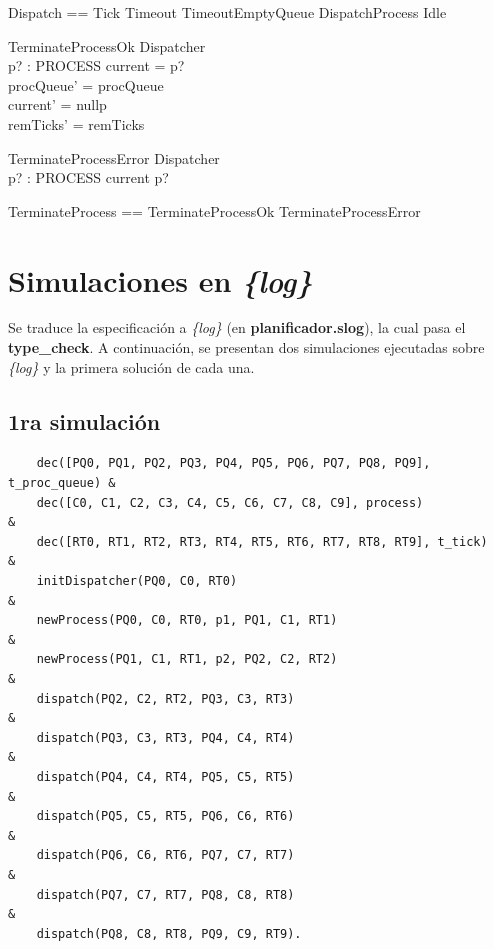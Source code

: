\documentclass{article}
\begin{document}
\begin{zed}
    Dispatch == Tick \lor Timeout \lor TimeoutEmptyQueue \lor DispatchProcess \lor Idle
\end{zed}

\begin{schema}{TerminateProcessOk}
    \Delta Dispatcher \\
    p? : PROCESS
\where
    current = p? \\
    procQueue' = procQueue \\
    current' = nullp \\
    remTicks' = remTicks
\end{schema}

\begin{schema}{TerminateProcessError}
    \Xi Dispatcher \\
    p? : PROCESS
\where
    current \neq p?
\end{schema}

\begin{zed}
    TerminateProcess == TerminateProcessOk \lor TerminateProcessError
\end{zed}


\section{Simulaciones en \textit{\{log\}}}

Se traduce la especificación a \textit{\{log\}} (en \textbf{planificador.slog}), la cual pasa el \textbf{type\_check}. A continuación, se presentan dos simulaciones ejecutadas sobre \textit{\{log\}} y la primera solución de cada una.


\subsection*{1ra simulación}

\begin{verbatim}
    dec([PQ0, PQ1, PQ2, PQ3, PQ4, PQ5, PQ6, PQ7, PQ8, PQ9], t_proc_queue) &
    dec([C0, C1, C2, C3, C4, C5, C6, C7, C8, C9], process)                &
    dec([RT0, RT1, RT2, RT3, RT4, RT5, RT6, RT7, RT8, RT9], t_tick)       &
    initDispatcher(PQ0, C0, RT0)                                          & 
    newProcess(PQ0, C0, RT0, p1, PQ1, C1, RT1)                            & 
    newProcess(PQ1, C1, RT1, p2, PQ2, C2, RT2)                            & 
    dispatch(PQ2, C2, RT2, PQ3, C3, RT3)                                  & 
    dispatch(PQ3, C3, RT3, PQ4, C4, RT4)                                  & 
    dispatch(PQ4, C4, RT4, PQ5, C5, RT5)                                  & 
    dispatch(PQ5, C5, RT5, PQ6, C6, RT6)                                  & 
    dispatch(PQ6, C6, RT6, PQ7, C7, RT7)                                  & 
    dispatch(PQ7, C7, RT7, PQ8, C8, RT8)                                  & 
    dispatch(PQ8, C8, RT8, PQ9, C9, RT9).
\end{verbatim}
\end{document}

